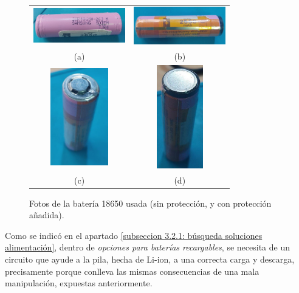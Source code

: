 \documentclass[12pt]{article}
\begin{document}
	\begin{figure}[h!]
		\begin{center}
			\begin{tabular}{cc}
				\includegraphics[width=40mm]{img/18650_sinProteccion.jpg} &   \includegraphics[width=40mm]{img/18650_conProteccion_1.jpg} \\
				(a) & (b) \\[6pt]
				\includegraphics[width=25mm]{img/18650_conProteccion_2.jpg} &   \includegraphics[width=20mm]{img/18650_conProteccion_3.jpg} \\
				(c)  & (d)  \\[6pt]
			\end{tabular}
			\caption{Fotos de la batería 18650 usada (sin protección, y con protección añadida).}
			\label{18650 con y sin proteccion}
		\end{center}
	\end{figure}
	
	\pagebreak
	
	\noindent Como se indicó en el apartado \ref{subseccion 3.2.1: búsqueda soluciones alimentación}, dentro de \textit{opciones para baterías recargables}, se necesita de un circuito que ayude a la pila, hecha de Li-ion, a una correcta carga y descarga, precisamente porque conlleva las mismas consecuencias de una mala manipulación, expuestas anteriormente. \\
		
\end{document}
